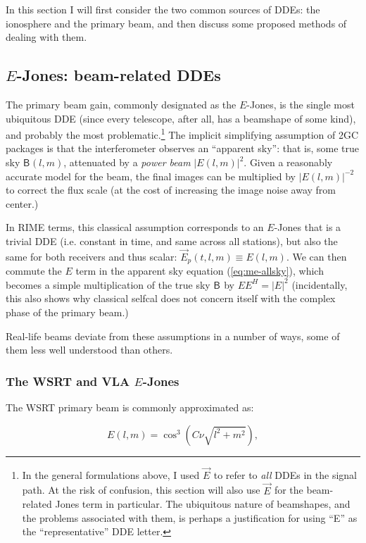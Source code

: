 \documentclass[]{aa}
\newcommand{\herm}{H}
\newcommand{\jones}[2]{\vec {#1}_{#2}}
\newcommand{\coh}[2]{\mathsf{{#1}}_{{#2}}}
\begin{document}
In this section I will first consider the two common sources of DDEs: the ionosphere and the primary beam, and
then discuss some proposed methods of dealing with them.

\subsection{$E$-Jones: beam-related DDEs\label{sec:EJones}}

The primary beam gain, commonly designated as the $E$-Jones, is the single most ubiquitous DDE (since every telescope, after all, has a beamshape of some kind), and probably the most problematic.\footnote{In the general formulations above, I used $\jones{E}{}$ to refer to {\em all} DDEs in the signal path. At the risk of confusion, this section will also use  $\jones{E}{}$ for the beam-related Jones term in particular. The ubiquitous nature of beamshapes, and the problems associated with them, is perhaps a justification for using ``E'' as the ``representative'' DDE letter.} The implicit simplifying assumption of 2GC packages is that the interferometer observes an ``apparent sky'': that is, some true sky $\coh{B}{}(l,m)$, attenuated by a {\em power beam} $|E(l,m)|^2$. Given a reasonably accurate model for the beam, the final images can be multiplied by $|E(l,m)|^{-2}$ to correct the flux scale (at the cost of increasing the image noise away from center.)

In RIME terms, this classical assumption corresponds to an $E$-Jones that is a trivial DDE (i.e. constant in time, and same across all stations), but also the same for both receivers and thus scalar: $\jones{E}{p}(t,l,m) \equiv E(l,m)$. We can then commute the $E$ term in the apparent sky equation (\ref{eq:me-allsky}), which becomes
a simple multiplication of the true sky $\coh{B}{}$ by $EE^\herm=|E|^2$ (incidentally, this also shows why classical selfcal does not concern itself with the complex phase of the primary beam.) 

Real-life beams deviate from these assumptions in a number of ways, some of them less well understood than others.

\subsubsection{The WSRT and VLA $E$-Jones\label{sec:EJones:wsrt}\label{sec:EJones:vla}}

The WSRT primary beam is commonly approximated as:

\[
E(l,m) = \cos^3(C\nu\sqrt{l^2+m^2}),
\]
\end{document}
